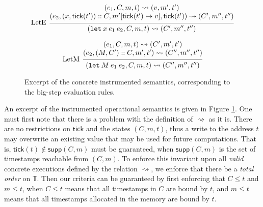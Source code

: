 \documentclass[acmsmall,review]{acmart}\settopmatter{printfolios=true,printccs=false,printacmref=false}
\theoremstyle{definition}
\theoremstyle{plain}
\newcommand*{\cons}{::}
\newcommand*{\Time}{\mathbb{T}}
\newcommand*{\mem}{m}
\newcommand*{\semarrow}{\rightsquigarrow}
\newcommand*{\tick}{\mathsf{tick}}
\begin{document}
\begin{figure}[h!]
  \[
    \begin{prooftree}
      \hypo{
        \begin{matrix}
          (e_{1}, C, \mem, t)
          \semarrow
          (v, \mem', t') \\
          (e_{2}, (x, \tick(t'))\cons C, \mem'[\tick(t')\mapsto v], \tick(t'))
          \semarrow
          (C', \mem'', t'')
        \end{matrix}
      }
      \infer[left label=LetE]1{
      (\mathtt{let}\:x\:e_1\:e_2, C, \mem, t)
      \semarrow
      (C', \mem'', t'')
      }
    \end{prooftree}
  \]

  \[
    \begin{prooftree}
      \hypo{
        \begin{matrix}
          (e_{1}, C, \mem, t)
          \semarrow
          (C', \mem', t') \\
          (e_{2}, (M, C')\cons C, \mem', t')
          \semarrow
          (C'', \mem'', t'')
        \end{matrix}
      }
      \infer[left label=LetM]1{
      (\mathtt{let}\:M\:e_{1}\:e_{2}, C, \mem, t)
      \semarrow
      (C'', \mem'', t'')
      }
    \end{prooftree}
  \]
  \caption{Excerpt of the concrete instrumented semantics, corresponding to the big-step evaluation rules.}
  \label{fig:concreach}
\end{figure}

An excerpt of the instrumented operational semantics is given in Figure \ref{fig:concreach}.
One must first note that there is a problem with the definition of $\semarrow$ as it is.
There are no restrictions on $\tick$ and the states $(C,\mem,t)$, thus a write to the address $t$ may overwrite an existing value that may be used for future computations.
That is, $\tick(t)\not\in\mathsf{supp}(C,\mem)$ must be guaranteed, when $\mathsf{supp}(C,\mem)$ is the set of timestamps reachable from $(C,\mem)$.
To enforce this invariant upon all \emph{valid} concrete executions defined by the relation $\semarrow$, we enforce that there be a \emph{total order} on $\Time$.
Then our criteria can be guaranteed by first enforcing that $C\le t$ and $\mem\le t$, when $C\le t$ means that all timestamps in $C$ are bound by $t$, and $\mem\le t$ means that all timestamps allocated in the memory are bound by $t$.
\end{document}
